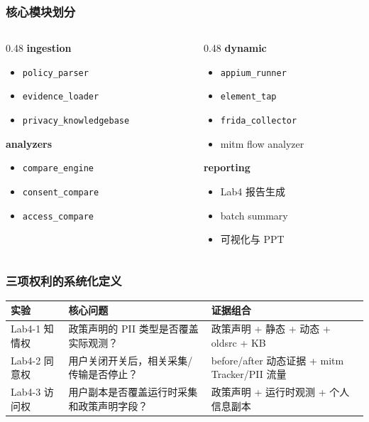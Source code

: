 \documentclass[AutoFakeBold,AutoFakeSlant]{beamer}
\newcommand{\code}[1]{\texttt{#1}}
\begin{document}
\begin{frame}
    \frametitle{核心模块划分}
    \small
    \begin{columns}[T]
        \begin{column}{0.48\textwidth}
            \textbf{ingestion}
            \begin{itemize}
                \item \code{policy\_parser}
                \item \code{evidence\_loader}
                \item \code{privacy\_knowledgebase}
            \end{itemize}
            \textbf{analyzers}
            \begin{itemize}
                \item \code{compare\_engine}
                \item \code{consent\_compare}
                \item \code{access\_compare}
            \end{itemize}
        \end{column}
        \begin{column}{0.48\textwidth}
            \textbf{dynamic}
            \begin{itemize}
                \item \code{appium\_runner}
                \item \code{element\_tap}
                \item \code{frida\_collector}
                \item mitm flow analyzer
            \end{itemize}
            \textbf{reporting}
            \begin{itemize}
                \item Lab4 报告生成
                \item batch summary
                \item 可视化与 PPT
            \end{itemize}
        \end{column}
    \end{columns}
\end{frame}

\begin{frame}
    \frametitle{三项权利的系统化定义}
    \small
    \begin{tabularx}{\textwidth}{|l|X|X|}
        \hline
        \textbf{实验} & \textbf{核心问题} & \textbf{证据组合} \\
        \hline
        Lab4-1 知情权 & 政策声明的 PII 类型是否覆盖实际观测？ & 政策声明 + 静态 + 动态 + oldsrc + KB \\
        \hline
        Lab4-2 同意权 & 用户关闭开关后，相关采集/传输是否停止？ & before/after 动态证据 + mitm Tracker/PII 流量 \\
        \hline
        Lab4-3 访问权 & 用户副本是否覆盖运行时采集和政策声明字段？ & 政策声明 + 运行时观测 + 个人信息副本 \\
        \hline
    \end{tabularx}
\end{frame}
\end{document}
